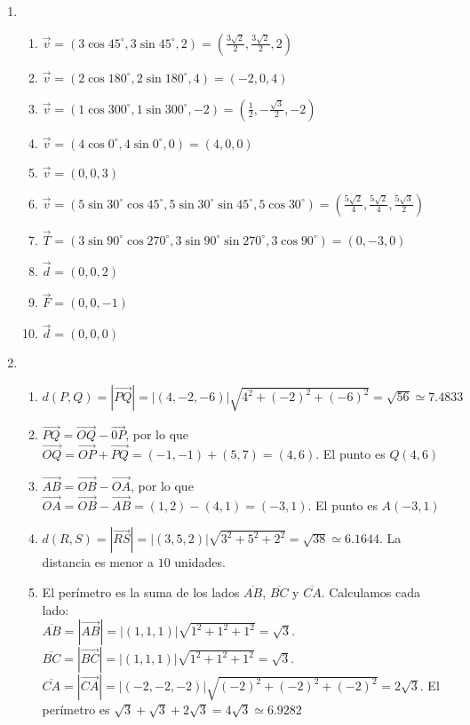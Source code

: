 \documentclass[a4paper]{article}
\newcommand{\exercise}{\item}
\newcommand{\df}[2]{\displaystyle\frac{#1}{#2}}
\newcommand{\vect}[1]{\overrightarrow{#1}}
\newcommand{\degs}{^{\circ}}
\begin{document}
\begin{enumerate}
\begin{enumerate} [label=(\alph*)]
\end{enumerate}\exercise\begin{enumerate} [label=(\alph*)]		\item $\vec{v} = (3 \cos{45\degs}, 3 \sin{45\degs}, 2)= \left(\df{3\sqrt{2}}{2}, \df{3\sqrt{2}}{2}, 2 \right)$
		\item $\vec{v} = (2 \cos{180\degs}, 2 \sin{180\degs}, 4)= (-2, 0, 4)$
		\item $\vec{v} = (1 \cos{300\degs}, 1 \sin{300\degs}, -2)= \left(\df{1}{2}, -\df{\sqrt{3}}{2}, -2 \right)$
		\item $\vec{v} = (4 \cos{0\degs}, 4 \sin{0\degs}, 0)= (4, 0, 0)$
		\item $\vec{v}=(0,0,3)$
		\item $\vec{v} = (5 \sin{30\degs} \cos{45\degs}, 5 \sin{30\degs} \sin{45\degs}, 5 \cos{30\degs})= \left(\df{5\sqrt{2}}{4}, \df{5\sqrt{2}}{4}, \df{5\sqrt{3}}{2} \right)$
		\item $\vec{T} = (3 \sin{90\degs} \cos{270\degs}, 3 \sin{90\degs} \sin{270\degs}, 3 \cos{90\degs})= (0, -3, 0)$
		\item $\vec{d} = (0, 0, 2)$
		\item $\vec{F} = (0, 0, -1)$
		\item $\vec{d} = (0, 0, 0)$
\end{enumerate}\exercise\begin{enumerate} [label=(\alph*)]		\item $d(P,Q) = \left| \vect{PQ} \right| = \left| (4,-2,-6) \right| \sqrt{4^2+(-2)^2+(-6)^2} = \sqrt{56} \simeq 7.4833$
		\item $\vect{PQ} = \vect{OQ} - \vect{0P}$, por lo que $\vect{OQ}=\vect{OP}+\vect{PQ}=(-1,-1)+(5,7)=(4,6)$. El punto es $Q(4,6)$
		\item $\vect{AB} = \vect{OB} - \vect{OA}$, por lo que $\vect{OA}=\vect{OB}-\vect{AB}=(1,2)-(4,1)=(-3,1)$. El punto es $A(-3,1)$
		\item $d(R,S) = \left| \vect{RS} \right| = \left| (3,5,2) \right| \sqrt{3^2+5^2+2^2} = \sqrt{38} \simeq 6.1644$. La distancia es menor a $10$ unidades.
		\item El perímetro es la suma de los lados $\overline{AB}$, $\overline{BC}$ y $\overline{CA}$. Calculamos cada lado: \\ $\overline{AB} = \left| \vect{AB}\right| = \left| (1,1,1) \right| \sqrt{1^2+1^2+1^2} = \sqrt{3}$. \\ $\overline{BC} = \left| \vect{BC}\right| = \left| (1,1,1) \right| \sqrt{1^2+1^2+1^2} = \sqrt{3}$. $\overline{CA} = \left| \vect{CA}\right| = \left| (-2,-2,-2) \right| \sqrt{(-2)^2+(-2)^2+(-2)^2} = 2\sqrt{3}$. El perímetro es $\sqrt{3}+\sqrt{3}+2\sqrt{3} = 4\sqrt{3} \simeq 6.9282$

\end{enumerate}
\end{enumerate}
\end{document}
